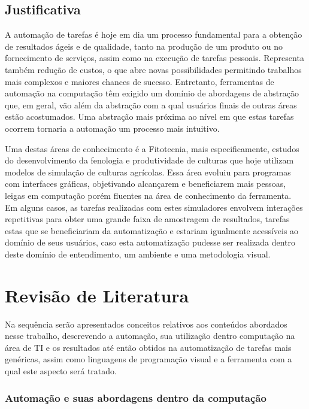 \documentclass[tg]{mdtufsm}
\begin{document}
	\section{Justificativa}	
	
	A automação de tarefas é hoje em dia um processo fundamental para a obtenção de resultados ágeis e de qualidade, tanto na produção de um produto ou no fornecimento de serviços, assim como na execução de tarefas pessoais. Representa também redução de custos, o que abre novas possibilidades permitindo trabalhos mais complexos e maiores chances de sucesso. Entretanto, ferramentas de automação na computação têm exigido um domínio de abordagens de abstração que, em geral, vão além da abstração com a qual usuários finais de outras áreas estão acostumados. Uma abstração mais próxima ao nível em que estas tarefas ocorrem tornaria a automação um processo mais intuitivo.
	
	Uma destas áreas de conhecimento é a Fitotecnia, mais especificamente, estudos do desenvolvimento da fenologia e produtividade de culturas que hoje utilizam modelos de simulação de culturas agrícolas. Essa área evoluiu para programas com interfaces gráficas, objetivando alcançarem e beneficiarem mais pessoas, leigas em computação porém fluentes na área de conhecimento da ferramenta. Em alguns casos, as tarefas realizadas com estes simuladores envolvem interações repetitivas para obter uma grande faixa de amostragem de resultados, tarefas estas que se beneficiariam da automatização e estariam igualmente acessíveis ao domínio de seus usuários, caso esta automatização pudesse ser realizada dentro deste domínio de entendimento, um ambiente e uma metodologia visual.  
	
	\chapter{Revisão de Literatura}
	Na sequência serão apresentados conceitos relativos aos conteúdos abordados nesse trabalho, descrevendo a automação, sua utilização dentro computação na área de TI e os resultados até então obtidos na automatização de tarefas mais genéricas, assim como linguagens de programação visual e a ferramenta com a qual este aspecto será tratado.
	
      

	\subsection{Automação e suas abordagens dentro da computação}
	
\end{document}
